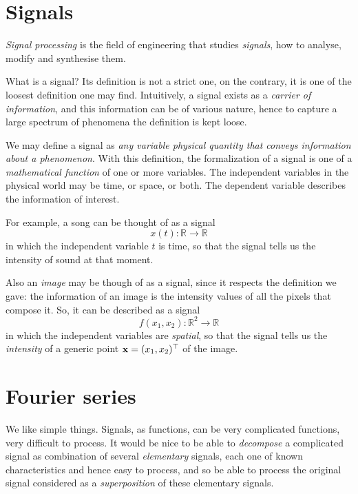 
\section{Signals}

\emph{Signal processing} is the field of engineering that studies \emph{signals}, how to analyse, modify and synthesise them.

What is a signal? Its definition is not a strict one, on the contrary, it is one of the loosest definition one may find. Intuitively, a signal exists as a \emph{carrier of information}, and this information can be of various nature, hence to capture a large spectrum of phenomena the definition is kept loose. 

We may define a signal as \emph{any variable physical quantity that conveys information about a phenomenon}. With this definition, the formalization of a signal is one of a \emph{mathematical function} of one or more variables. The independent variables in the physical world may be time, or space, or both. The dependent variable describes the information of interest. 

For example, a song can be thought of as a signal
\begin{equation}
    x(t): \mathbb{R} \to \mathbb{R}
\end{equation} 
in which the independent variable $t$ is time, so that the signal tells us the intensity of sound at that moment.

Also an \emph{image} may be though of as a signal, since it respects the definition we gave: the information of an image is the intensity values of all the pixels that compose it. So, it can be described as a signal
\begin{equation}
    f(x_1, x_2): \mathbb{R}^2 \to \mathbb{R}
\end{equation}
in which the independent variables are \emph{spatial}, so that the signal tells us the \emph{intensity} of a generic point $\vb{x} = (x_1, x_2)^{\top}$ of the image.

\section{Fourier series}


We like simple things. Signals, as functions, can be very complicated functions, very difficult to process. It would be nice to be able to \emph{decompose} a complicated signal as combination of several \emph{elementary} signals, each one of known characteristics and hence easy to process, and so be able to process the original signal considered as a \emph{superposition} of these elementary signals.

